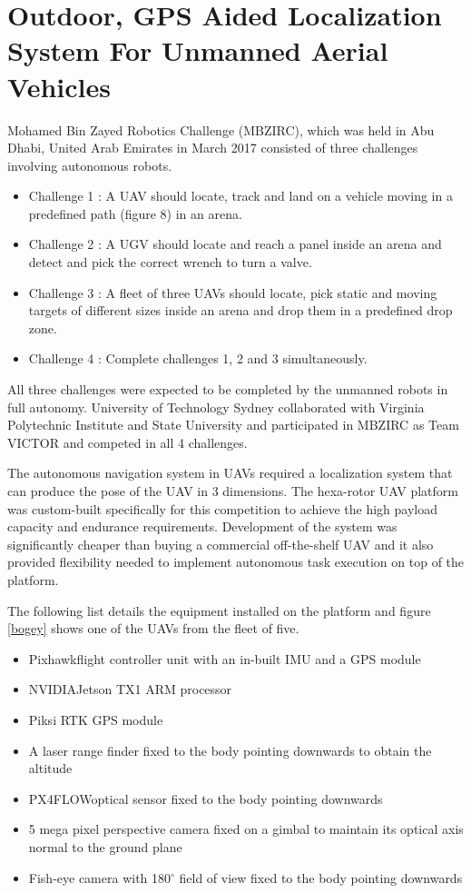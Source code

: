\documentclass[12pt,a4paper]{report}
\begin{document}
\section{Outdoor, GPS Aided Localization System For Unmanned Aerial Vehicles}
\label{mbzircProgress}
Mohamed Bin Zayed Robotics Challenge (MBZIRC), which was held in Abu Dhabi, United Arab Emirates in March 2017 consisted of three challenges involving autonomous robots.\par

\begin{itemize}
\item Challenge 1 : A UAV should locate, track and land on a vehicle moving in a predefined path (figure 8) in an arena. 
\item Challenge 2 : A UGV should locate and reach a panel inside an arena and detect and pick the correct wrench to turn a valve.
\item Challenge 3 : A fleet of three UAVs should locate, pick static and moving targets of different sizes inside an arena and drop them in a predefined drop zone.
\item Challenge 4 : Complete challenges 1, 2 and 3 simultaneously.
\end{itemize}

All three challenges were expected to be completed by the unmanned robots in full autonomy. University of Technology Sydney collaborated with Virginia Polytechnic Institute and State University and participated in MBZIRC as Team VICTOR and competed in all 4 challenges.\par

The autonomous navigation system in UAVs required a localization system that can produce the pose of the UAV in 3 dimensions. The hexa-rotor UAV platform was custom-built specifically for this competition to achieve the high payload capacity and endurance requirements. Development of the system was significantly cheaper than buying a commercial off-the-shelf UAV and it also provided flexibility needed to implement autonomous task execution on top of the platform.\par

The following list details the equipment installed on the platform and figure \ref{bogey} shows one of the UAVs from the fleet of five.\par
\begin{itemize}
\item Pixhawk\texttrademark flight controller unit with an in-built IMU and a GPS module
\item NVIDIA\texttrademark Jetson TX1 ARM processor
\item Piksi RTK GPS module
\item A laser range finder fixed to the body pointing downwards to obtain the altitude
\item PX4FLOW\texttrademark optical sensor fixed to the body pointing downwards
\item 5 mega pixel perspective camera fixed on a gimbal to maintain its optical axis normal to the ground plane
\item Fish-eye camera with 180$^{\circ}$ field of view fixed to the body pointing downwards
\end{itemize}
\end{document}
